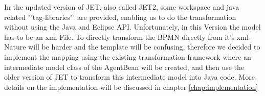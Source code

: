 In the updated version of JET, also called JET2, some workspace and java related "'tag-libraries"' are provided, enabling us to do the transformation without using the Java and Eclipse API. Unfortunately, in this Version the model has to be an xml-File.
To directly transform the BPMN directly from it's xml-Nature will be harder and the template will be confusing, therefore we decided to implement the mapping using the existing transformation framework where an intermediate model class of the AgentBean will be created, and then use the older version of JET to transform this intermediate model into Java code. More details on the implementation will be discussed in chapter \ref{chap:implementation}
